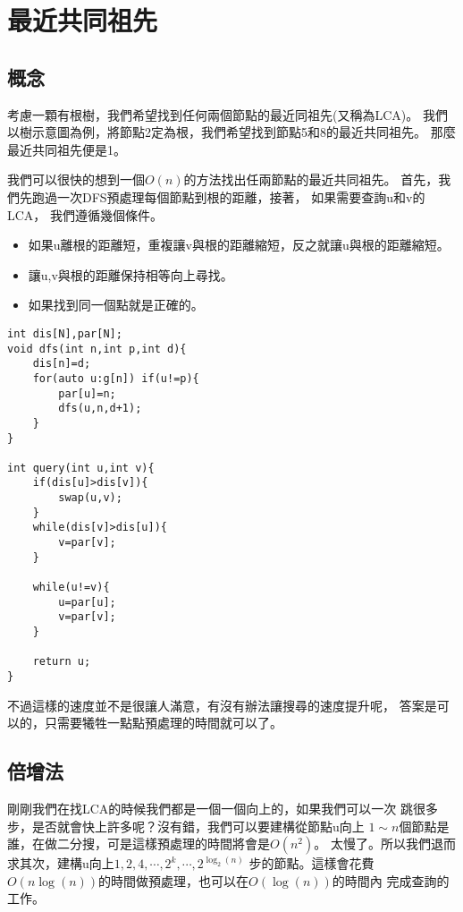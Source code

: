 \section{最近共同祖先}
    \subsection{概念}
    考慮一顆有根樹，我們希望找到任何兩個節點的最近同祖先(又稱為LCA)。
    我們以樹示意圖為例，將節點2定為根，我們希望找到節點5和8的最近共同祖先。
    那麼最近共同祖先便是1。

    我們可以很快的想到一個$O(n)$的方法找出任兩節點的最近共同祖先。
    首先，我們先跑過一次DFS預處理每個節點到根的距離，接著，
    如果需要查詢u和v的LCA，
    我們遵循幾個條件。

    \begin{itemize}
        \item 如果u離根的距離短，重複讓v與根的距離縮短，反之就讓u與根的距離縮短。
        \item 讓u,v與根的距離保持相等向上尋找。
        \item 如果找到同一個點就是正確的。
    \end{itemize}

\begin{lstlisting}[caption=$O(n)$ LCA算法]
int dis[N],par[N];
void dfs(int n,int p,int d){
    dis[n]=d;
    for(auto u:g[n]) if(u!=p){
        par[u]=n;
        dfs(u,n,d+1);
    }
}

int query(int u,int v){
    if(dis[u]>dis[v]){
        swap(u,v);
    }
    while(dis[v]>dis[u]){
        v=par[v];
    }

    while(u!=v){
        u=par[u];
        v=par[v];
    }

    return u;
}
\end{lstlisting}

    不過這樣的速度並不是很讓人滿意，有沒有辦法讓搜尋的速度提升呢，
    答案是可以的，只需要犧牲一點點預處理的時間就可以了。

    \subsection{倍增法}
    剛剛我們在找LCA的時候我們都是一個一個向上的，如果我們可以一次
    跳很多步，是否就會快上許多呢？沒有錯，我們可以要建構從節點u向上
    $1 \sim n$個節點是誰，在做二分搜，可是這樣預處理的時間將會是$O(n^2)$。
    太慢了。所以我們退而求其次，建構u向上$1,2,4,\cdots, 2^k, \cdots , 2^{\log_{2}{(n)}}$
    步的節點。這樣會花費$O(n\log{(n)})$的時間做預處理，也可以在$O(\log{(n)})$的時間內
    完成查詢的工作。

